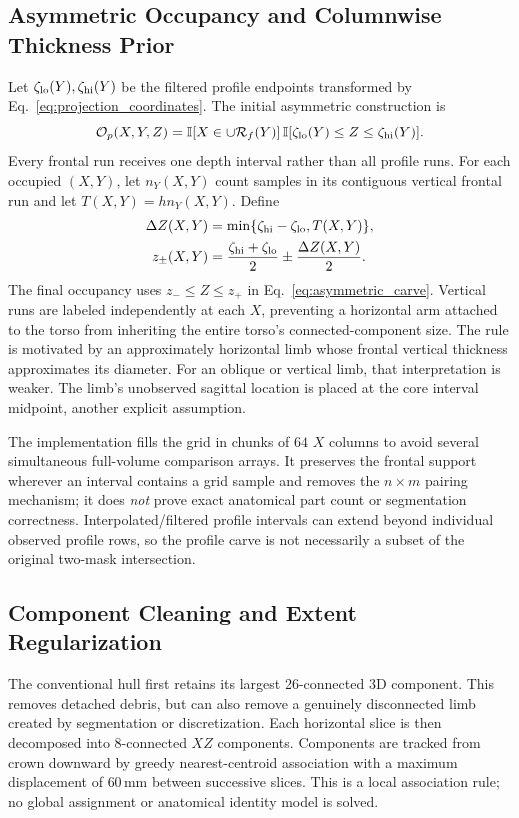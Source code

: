 \documentclass[journal]{IEEEtran}
\begin{document}
\subsection{Asymmetric Occupancy and Columnwise Thickness Prior}
Let $\zeta_{\rm lo}(Y),\zeta_{\rm hi}(Y)$ be the filtered profile endpoints transformed by Eq.~\eqref{eq:projection_coordinates}. The initial asymmetric construction is
\begin{equation}
\mathcal O_p(X,Y,Z)=\mathbb I[X\in\cup\mathcal R_f(Y)]\,
\mathbb I[\zeta_{\rm lo}(Y)\le Z\le\zeta_{\rm hi}(Y)].
\label{eq:asymmetric_carve}
\end{equation}
Every frontal run receives one depth interval rather than all profile runs. For each occupied $(X,Y)$, let $n_Y(X,Y)$ count samples in its contiguous vertical frontal run and let $T(X,Y)=hn_Y(X,Y)$. Define
\begin{align}
\Delta Z(X,Y)&=\min\{\zeta_{\rm hi}-\zeta_{\rm lo},T(X,Y)\},\label{eq:depth_narrowing}\\
z_\pm(X,Y)&=\frac{\zeta_{\rm hi}+\zeta_{\rm lo}}{2}\pm\frac{\Delta Z(X,Y)}2.\nonumber
\end{align}
The final occupancy uses $z_-\le Z\le z_+$ in Eq.~\eqref{eq:asymmetric_carve}. Vertical runs are labeled independently at each $X$, preventing a horizontal arm attached to the torso from inheriting the entire torso's connected-component size. The rule is motivated by an approximately horizontal limb whose frontal vertical thickness approximates its diameter. For an oblique or vertical limb, that interpretation is weaker. The limb's unobserved sagittal location is placed at the core interval midpoint, another explicit assumption.

The implementation fills the grid in chunks of $64$ $X$ columns to avoid several simultaneous full-volume comparison arrays. It preserves the frontal support wherever an interval contains a grid sample and removes the $n\times m$ pairing mechanism; it does \emph{not} prove exact anatomical part count or segmentation correctness. Interpolated/filtered profile intervals can extend beyond individual observed profile rows, so the profile carve is not necessarily a subset of the original two-mask intersection.

\subsection{Component Cleaning and Extent Regularization}
\label{subsec:extent_reg}
The conventional hull first retains its largest 26-connected 3D component. This removes detached debris, but can also remove a genuinely disconnected limb created by segmentation or discretization. Each horizontal slice is then decomposed into 8-connected $XZ$ components. Components are tracked from crown downward by greedy nearest-centroid association with a maximum displacement of $60$\,mm between successive slices. This is a local association rule; no global assignment or anatomical identity model is solved.
\end{document}
